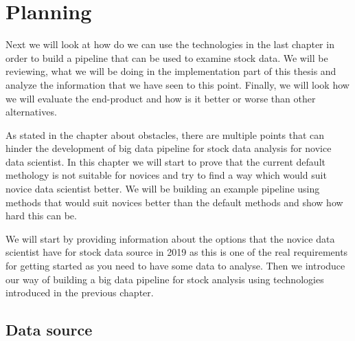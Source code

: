 \chapter{Planning}
\label{chapter:methods}


Next we will look at how do we can use the technologies in the last chapter in order to build a pipeline that can be used to examine stock data.
We will be reviewing, what we will be doing in the implementation part of this thesis and analyze the information that we have seen to this point.
Finally, we will look how we will evaluate the end-product and how is it better or worse than other alternatives.

As stated in the chapter about obstacles, there are multiple points that can hinder the development of big data pipeline for stock data analysis for novice data scientist.
In this chapter we will start to prove that the current default methology is not suitable for novices and try to find a way which would suit novice data scientist better.
We will be building an example pipeline using methods that would suit novices better than the default methods and show how hard this can be.

We will start by providing information about the options that the novice data scientist have for stock data source in 2019 as this is one of the real requirements for getting started as you need to have some data to analyse.
Then we introduce our way of building a big data pipeline for stock analysis using technologies introduced in the previous chapter.


\section{Data source}

